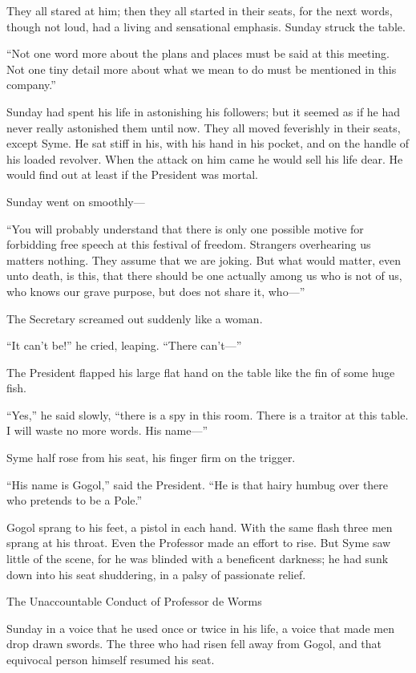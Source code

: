 They all stared at him; then they all started in their seats, for the next words, though not loud, had a living and sensational emphasis. Sunday struck the table.

“Not one word more about the plans and places must be said at this meeting. Not one tiny detail more about what we mean to do must be mentioned in this company.”

Sunday had spent his life in astonishing his followers; but it seemed as if he had never really astonished them until now. They all moved feverishly in their seats, except Syme. He sat stiff in his, with his hand in his pocket, and on the handle of his loaded revolver. When the attack on him came he would sell his life dear. He would find out at least if the President was mortal.

Sunday went on smoothly⁠—

“You will probably understand that there is only one possible motive for forbidding free speech at this festival of freedom. Strangers overhearing us matters nothing. They assume that we are joking. But what would matter, even unto death, is this, that there should be one actually among us who is not of us, who knows our grave purpose, but does not share it, who⁠—”

The Secretary screamed out suddenly like a woman.

“It can’t be!” he cried, leaping. “There can’t⁠—”

The President flapped his large flat hand on the table like the fin of some huge fish.

“Yes,” he said slowly, “there is a spy in this room. There is a traitor at this table. I will waste no more words. His name⁠—”

Syme half rose from his seat, his finger firm on the trigger.

“His name is Gogol,” said the President. “He is that hairy humbug over there who pretends to be a Pole.”

Gogol sprang to his feet, a pistol in each hand. With the same flash three men sprang at his throat. Even the Professor made an effort to rise. But Syme saw little of the scene, for he was blinded with a beneficent darkness; he had sunk down into his seat shuddering, in a palsy of passionate relief.

\chap[unaccountable] The Unaccountable Conduct of Professor de Worms

 Sunday in a voice that he used once or twice in his life, a voice that made men drop drawn swords.\nl
The three who had risen fell away from Gogol, and that equivocal person himself resumed his seat.


